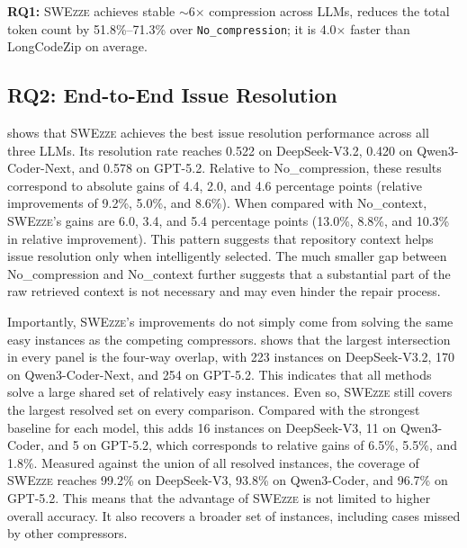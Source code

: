 \documentclass[sigconf,nonacm]{acmart}
\newcommand{\projName}{\textsc{SWEzze}\xspace}
\begin{document}
\begin{tcolorbox}[colback=gray!5, colframe=black!20, arc=2pt, boxrule=0.3mm, breakable, sharp corners, left=2pt, right=2pt, top=2pt, bottom=2pt]
\textbf{RQ1:} \projName achieves stable $\sim$6$\times$ compression across LLMs, reduces the total token count by 51.8\%--71.3\% over \texttt{No\_compression}; it is 4.0$\times$ faster than LongCodeZip on average.
\end{tcolorbox}


\subsection{RQ2: End-to-End Issue Resolution}
\label{sec:eval:rq2}

 shows that \projName achieves the best issue resolution performance across all three LLMs.  Its resolution rate reaches 0.522 on DeepSeek-V3.2, 0.420 on Qwen3-Coder-Next, and 0.578 on GPT-5.2. Relative to No\_compression, these results correspond to absolute gains of 4.4, 2.0, and 4.6 percentage points (relative improvements of 9.2\%, 5.0\%, and 8.6\%). When compared with No\_context, \projName's gains are 6.0, 3.4, and 5.4 percentage points (13.0\%, 8.8\%, and 10.3\% in relative improvement). This pattern suggests that repository context helps issue resolution only when intelligently selected. The much smaller gap between No\_compression and No\_context further suggests that a substantial part of the raw retrieved context is not necessary and may even hinder the repair process.

Importantly, \projName's improvements do not simply come from solving the same easy instances as the competing compressors.  shows that the largest intersection in every panel is the four-way overlap, with 223 instances on DeepSeek-V3.2, 170 on Qwen3-Coder-Next, and 254 on GPT-5.2. This indicates that all methods solve a large shared set of relatively easy instances. Even so, \projName still covers the largest resolved set on every comparison. Compared with the strongest baseline for each model, this adds 16 instances on DeepSeek-V3, 11 on Qwen3-Coder, and 5 on GPT-5.2, which corresponds to relative gains of 6.5\%, 5.5\%, and 1.8\%. Measured against the union of all resolved instances, the coverage of \projName reaches 99.2\% on DeepSeek-V3, 93.8\% on Qwen3-Coder, and 96.7\% on GPT-5.2. This means that the advantage of \projName is not limited to higher overall accuracy. It also recovers a broader set of instances, including cases missed by other compressors.
\end{document}
